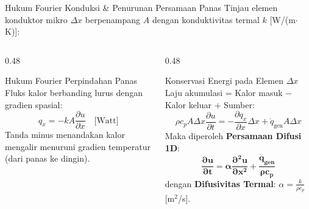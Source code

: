 \documentclass[aspectratio=169,10pt]{beamer}
\begin{document}
\begin{frame}{Hukum Fourier Konduksi \& Penurunan Persamaan Panas}
  Tinjau elemen konduktor mikro $\Delta x$ berpenampang $A$ dengan konduktivitas termal $k$ [W/(m$\cdot$K)]:
  \vspace{0.1cm}
  \begin{columns}[t]
    \begin{column}{0.48\textwidth}
      \begin{block}{Hukum Fourier Perpindahan Panas}
        \small
        Fluks kalor berbanding lurus dengan gradien spasial:
        \begin{equation*}
          q_x = -k A \frac{\partial u}{\partial x} \quad \text{[Watt]}
        \end{equation*}
        Tanda minus menandakan kalor mengalir menuruni gradien temperatur (dari panas ke dingin).
      \end{block}
    \end{column}
    \begin{column}{0.48\textwidth}
      \begin{alertblock}{Konservasi Energi pada Elemen $\Delta x$}
        \small
        Laju akumulasi = Kalor masuk $-$ Kalor keluar $+$ Sumber:
        \begin{equation*}
          \rho c_p A \Delta x \frac{\partial u}{\partial t} = -\frac{\partial q_x}{\partial x} \Delta x + \dot{q}_{\text{gen}} A \Delta x
        \end{equation*}
        Maka diperoleh \textbf{Persamaan Difusi 1D}:
        \begin{equation*}
          \mathbf{\frac{\partial u}{\partial t} = \alpha \frac{\partial^2 u}{\partial x^2} + \frac{\dot{q}_{\text{gen}}}{\rho c_p}}
        \end{equation*}
        dengan \textbf{Difusivitas Termal}: $\alpha = \frac{k}{\rho c_p}$ [m$^2$/s].
      \end{alertblock}
    \end{column}
  \end{columns}
\end{frame}
\end{document}
